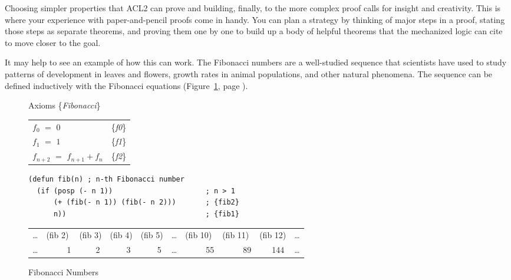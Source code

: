 Choosing simpler properties that ACL2 can prove
and building, finally, to the more complex proof
calls for insight and creativity.
This is where your experience with paper-and-pencil proofs
come in handy.
You can plan a strategy by thinking of major steps
in a proof, stating those steps as separate theorems,
and proving them one by one to build up a body
of helpful theorems that the mechanized logic
can cite to move closer to the goal.

It may help to see an example of how this can work.
The Fibonacci numbers are a well-studied sequence that
scientists have used to study
patterns of development in leaves and flowers,
growth rates in animal populations,
and other natural phenomena.
The sequence can be defined inductively
with the Fibonacci equations
(Figure~\ref{fig:Fibonacci-axioms}, page \pageref{fig:Fibonacci-axioms}).

\begin{figure}
\begin{center}
Axioms \{\emph{Fibonacci}\}
\begin{tabular}{ll}
$f_0$ $=$ $0$                   & \{\emph{f0}\} \\
$f_1$ $=$ $1$                   & \{\emph{f1}\} \\
$f_{n+2}$ $=$ $f_{n+1} + f_{n}$ & \{\emph{f2}\} \\
\end{tabular}
\begin{code}
\begin{verbatim}
(defun fib(n) ; n-th Fibonacci number
  (if (posp (- n 1))                      ; n > 1
      (+ (fib(- n 1)) (fib(- n 2)))       ; {fib2}
      n))                                 ; {fib1}
\end{verbatim}
\end{code}

\begin{tabular}{llllllllll}
\dots & (fib 2) & (fib 3) & (fib 4) & (fib 5) & \dots & (fib 10) & (fib 11) & (fib 12) & \dots \\
\dots & ~~~~~1  &  ~~~~2  &  ~~~~3  &  ~~~~5  & \dots &  ~~~~~55 &  ~~~~~89 & ~~~144   & \dots \\
\end{tabular}
\end{center}
\caption{Fibonacci Numbers}
\label{fig:Fibonacci-axioms}
\end{figure}

